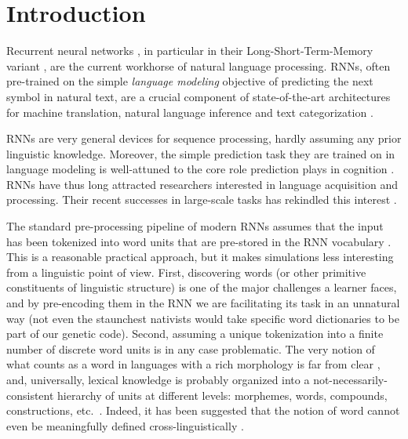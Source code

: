 \section{Introduction}
\label{sec:introduction}


Recurrent neural networks \cite[RNNs,][]{Elman:1990}, in particular
in their Long-Short-Term-Memory variant
\cite[LSTMs,][]{Hochreiter:Schmidhuber:1997}, are the current
workhorse of natural language processing. RNNs, often
pre-trained on the simple \emph{language modeling} objective of
predicting the next symbol in natural text, are a crucial
component of state-of-the-art architectures for machine
translation, natural language inference and text categorization
\cite{Goldberg:2017}.

RNNs are very general devices for sequence processing, hardly assuming
any prior linguistic knowledge. Moreover, the simple prediction task
they are trained on in language modeling is well-attuned to the core
role prediction plays in cognition
\cite[e.g.,][]{Bar:2007,Clark:2016}. RNNs have thus long attracted
researchers interested in language acquisition and processing. Their
recent successes in large-scale tasks has rekindled
this interest \cite[e.g.,][]{Frank:etal:2013,Lau:etal:2017,Kirov:Cotterell:2018,Linzen:etal:2018,McCoy:etal:2018,Pater:2018}.

The standard pre-processing pipeline of modern RNNs assumes that the
input has been tokenized into word units that are pre-stored in the
RNN vocabulary \cite{Goldberg:2017}. This is a reasonable practical
approach, but it makes simulations less interesting from a linguistic
point of view. First, discovering words (or other primitive
constituents of linguistic structure) is one of the major challenges a
learner faces, and by pre-encoding them in the RNN we are facilitating
its task in an unnatural way (not even the staunchest nativists would
take specific word dictionaries to be part of our genetic
code). Second, assuming a unique tokenization into a finite number of
discrete word units is in any case problematic. The very notion of
what counts as a word in languages with a rich morphology is far from
clear \cite[e.g.,][]{Dixon:Aikhenvald:2002,Bickel:Zuniga:2017}, and,
universally, lexical knowledge is probably organized into a
not-necessarily-consistent hierarchy of units at different levels:
morphemes, words, compounds, constructions,
etc.~\cite[e.g.,][]{Goldberg:2005}. Indeed, it has been suggested that
the notion of word cannot even be meaningfully defined
cross-linguistically \cite{Haspelmath:2011}.

